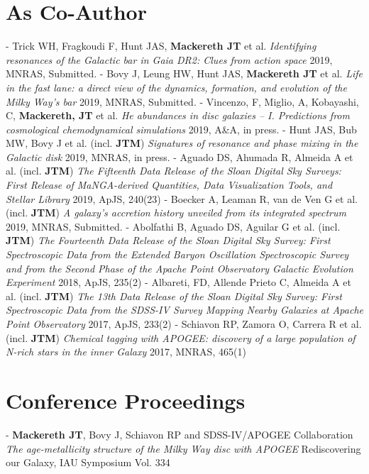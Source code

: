 \documentclass[margin]{res}
\begin{document}
\begin{resume}
\section{As Co-Author}
- Trick WH, Fragkoudi F, Hunt JAS, \textbf{Mackereth JT} et al. \emph{Identifying resonances of the Galactic bar in Gaia DR2: Clues from action space} 2019, MNRAS, Submitted. 
\newline - Bovy J, Leung HW, Hunt JAS, \textbf{Mackereth JT} et al. \emph{Life in the fast lane: a direct view of the dynamics, formation, and evolution of the Milky Way's bar} 2019, MNRAS, Submitted. 
\newline - Vincenzo, F, Miglio, A, Kobayashi, C, \textbf{Mackereth, JT} et al. \emph{He abundances in disc galaxies -- I. Predictions from cosmological chemodynamical simulations} 2019, A\&A, in press. 
\newline - Hunt JAS, Bub MW, Bovy J et al. (incl. \textbf{JTM}) \emph{Signatures of resonance and phase mixing in the Galactic disk} 2019, MNRAS, in press.
\newline - Aguado DS, Ahumada R, Almeida A et al. (incl. \textbf{JTM}) \emph{The Fifteenth Data Release of the Sloan Digital Sky Surveys: First Release of MaNGA-derived Quantities, Data Visualization Tools, and Stellar Library} 2019, ApJS, 240(23)
\newline - Boecker A, Leaman R, van de Ven G et al. (incl. \textbf{JTM}) \emph{A galaxy's accretion history unveiled from its integrated spectrum} 2019, MNRAS, Submitted.
\newline - Abolfathi B, Aguado DS, Aguilar G et al. (incl. \textbf{JTM}) \emph{The Fourteenth Data Release of the Sloan Digital Sky Survey: First Spectroscopic Data from the Extended Baryon Oscillation Spectroscopic Survey and from the Second Phase of the Apache Point Observatory Galactic Evolution Experiment} 2018, ApJS, 235(2)
\newline - Albareti, FD, Allende Prieto C, Almeida A et al. (incl. \textbf{JTM}) \emph{The 13th Data Release of the Sloan Digital Sky Survey: First Spectroscopic Data from the SDSS-IV Survey Mapping Nearby Galaxies at Apache Point Observatory} 2017, ApJS, 233(2)
\newline - Schiavon RP, Zamora O, Carrera R et al. (incl. \textbf{JTM}) \emph{Chemical tagging with APOGEE: discovery of a large population of N-rich stars in the inner Galaxy} 2017, MNRAS, 465(1)

\section{Conference Proceedings}
- \textbf{Mackereth JT}, Bovy J, Schiavon RP and SDSS-IV/APOGEE Collaboration \emph{The age-metallicity structure of the Milky Way disc with APOGEE} Rediscovering our Galaxy, IAU Symposium Vol. 334

\end{resume}
\end{document}

